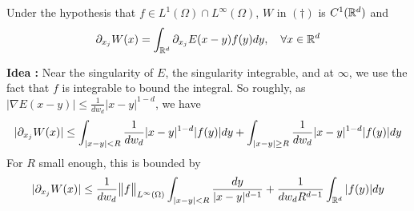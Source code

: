 \documentclass[12pt,a4paper]{article}
\newenvironment{proof}
{\begin{changemargin}{1cm}{0.5cm} 
	}%
	{\end{changemargin}
}
\newenvironment{p}
{\begin{proof} 
	}%
	{\end{proof}
}
\begin{document}
 Under the hypothesis that $f\in L^1(\Omega) \cap L^{\infty}(\Omega)$, $W$ in $(\dagger)$ is $C^1(\mathbb{R}^d)$ and
\begin{align*}
\partial_{x_j} W(x) = \int_{\mathbb{R}^d} \partial_{x_j} E(x-y) f(y) dy, \quad \forall x\in \mathbb{R}^d
\end{align*}
\begin{p}
\textbf{Idea :} Near the singularity of $E$, the singularity integrable, and at $\infty$, we use the fact that $f$ is integrable to bound the integral. So roughly, as $|\nabla E(x-y)| \leq \frac{1}{dw_d} |x-y|^{1-d}$, we have
\begin{align*}
|\partial_{x_j} W(x)| \leq \int_{|x-y|<R} \frac{1}{dw_d} |x-y|^{1-d} |f(y)| dy + \int_{|x-y|\geq R} \frac{1}{dw_d} |x-y|^{1-d} |f(y)|dy
\end{align*}
For $R$ small enough, this is bounded by
\begin{align*}
|\partial_{x_j} W(x)| \leq \frac{1}{dw_d} \bigl\lVert f\bigr\rVert_{L^{\infty}(\Omega)} \int_{|x-y|< R} \frac{dy}{|x-y|^{d-1}} + \frac{1}{dw_d R^{d-1}} \int_{\mathbb{R}^{d}} |f(y)| dy
\end{align*}



\end{p}
\end{document}
